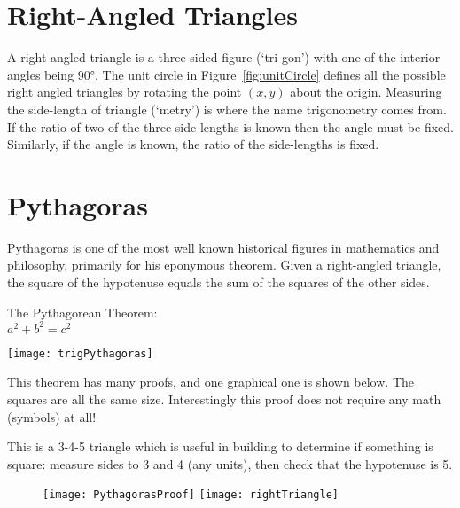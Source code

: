 \section{Right-Angled Triangles}
A right angled triangle is a three-sided figure (`tri-gon') with one of the interior angles being \ang{90}. The unit circle in Figure~\ref{fig:unitCircle} defines all the possible right angled triangles by rotating the point $(x,y)$ about the origin. Measuring the side-length of triangle (`metry') is where the name trigonometry comes from. If the ratio of two of the three side lengths is known then the angle must be fixed. Similarly, if the angle is known, the ratio of the side-lengths is fixed.

\section*{Pythagoras}
Pythagoras is one of the most well known historical figures in mathematics and philosophy, primarily for his eponymous theorem. Given a right-angled triangle, the square of the hypotenuse equals the sum of the squares of the other sides.
\begin{tcolorbox}[colback=white]
	\begin{multicols}{2}
		\begin{center}
			The Pythagorean Theorem:\\
			\vspace{1cm}$a^2+b^2=c^2$
		\end{center}
		\columnbreak
		\begin{center}
			\texttt{[image: trigPythagoras]}
		\end{center}
	\end{multicols}
\end{tcolorbox}

This theorem has many proofs, and one graphical one is shown below. The squares are all the same size. Interestingly this proof does not require any math (symbols) at all!

This is a 3-4-5 triangle which is useful in building to determine if something is square: measure sides to 3 and 4 (any units), then check that the hypotenuse is 5.

\begin{figure}
\begin{center}
	\texttt{[image: PythagorasProof]}
\hspace{1cm}
	\texttt{[image: rightTriangle]}
\end{center}
\end{figure}
